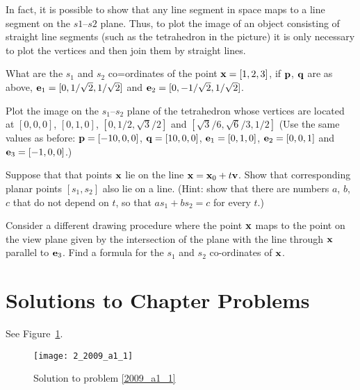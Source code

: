 In fact, it is possible to show that any line segment in space maps to a line
segment on the $s1$--$s2$ plane. Thus, to plot the image of an object consisting
of straight line segments (such as the tetrahedron in the picture) it is only
necessary to plot the vertices and then join them by straight lines.

\begin{problem}
\label{op1_33}
What are the $s_1$ and $s_2$ co=ordinates of the point ${\bf x}=[1,2,3]$, if ${\bf p}$,
${\bf q}$ are as above, ${\bf e}_1=[0,1/\sqrt{2},1/\sqrt{2}]$ and 
${\bf e}_2=[0,-1/\sqrt{2},1/\sqrt{2}]$.
\end{problem}

\begin{problem}
\label{op1_34}
Plot the image on the $s_1$--$s_2$ plane of the tetrahedron whose 
vertices are located at
$[0,0,0]$, $[0,1,0]$, $[0,1/2,\sqrt{3}/2]$ and $[\sqrt{3}/6,\sqrt{6}/3,1/2]$
(Use the same values as before: ${\bf p}=[-10,0,0]$, ${\bf q}=[10,0,0]$, ${\bf e}_1=[0,1,0]$,
${\bf e}_2=[0,0,1]$ and ${\bf e}_3=[-1,0,0]$.)
\end{problem}

\begin{problem}
\label{op1_35}
Suppose that that points ${\bf x}$ lie on the line ${\bf x}={\bf x}_0 + t{\bf v}$. 
Show that corresponding planar points $[s_1,s_2]$ also lie on a line. (Hint: show that
there are numbers $a$, $b$, $c$ that do not depend on $t$, so that $a s_1 + b s_2 = c$ for
every $t$.)
\end{problem}

\begin{problem}
\label{op1_36}
Consider a different drawing procedure where the point ${\bf x}$ maps to the 
point on the view plane given by the intersection of the plane with the line
through ${\bf x}$ parallel to ${\bf e}_3$. Find a formula for the $s_1$ and $s_2$
co-ordinates of ${\bf x}$.
\end{problem}

\section{Solutions to Chapter Problems}

 See Figure~\ref{2009_a1_1_sol}.

\begin{figure}[htb]
\centerline{\texttt{[image: 2\_2009\_a1\_1]}}
\caption{Solution to problem \ref{2009_a1_1} \label{2009_a1_1_sol}}
\end{figure}

